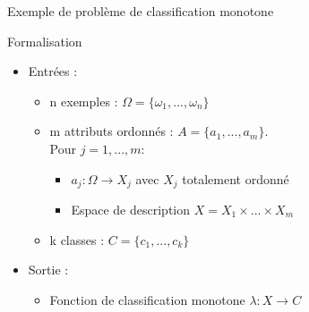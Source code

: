 \documentclass[usenames,dvipsnames]{beamer}
\begin{document}
\begin{frame}{Exemple de problème de classification monotone}
\textcite{potharst-classification-bank}

\begin{table}
\label{tab:bank-loan-dataset}
\end{table}

\end{frame}

\begin{frame}{Formalisation}

\begin{itemize}
\item Entrées :  
\begin{itemize}
	\item n exemples : $\Omega = \{\omega_1, ... , \omega_n\}$
    \item m attributs ordonnés : $A = \{a_1, ... , a_m\}$. \\ Pour $j=1,... ,m :$
    	\begin{itemize}
    	\item $a_j : \Omega \rightarrow X_j$ avec $X_j$ totalement ordonné
        \item Espace de description $X = X_1 \times ... \times X_m$
    	\end{itemize}
    \item k classes : $C = \{c_1, ... , c_k\}$
\end{itemize}
\item Sortie : 
\begin{itemize}
\item Fonction de classification monotone $\lambda : X \rightarrow C$
\end{itemize}
\end{itemize}

\end{frame}
\end{document}
